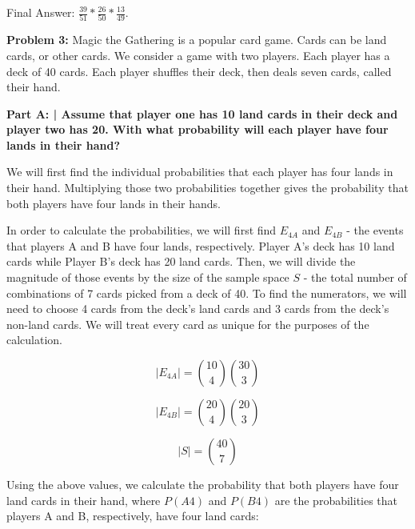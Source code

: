\documentclass{article}
\begin{document}
 Final Answer: $\frac{39}{51} * \frac{26}{50} * \frac{13}{49}$.\newline
 
 \newpage

 \begin{center}
      \Large\textbf{Problem 3:} Magic the Gathering is a popular card game. Cards can be land cards, or other cards. We consider a game with two players. Each player has a deck of 40 cards. Each player shuffles their deck, then deals seven cards, called their hand.\par
 \end{center}

 \textbf{Part A: | Assume that player one has 10 land cards in their deck and player two has 20. With what probability will each player have four lands in their hand?}\newline
 
 We will first find the individual probabilities that each player has four lands in their hand. Multiplying those two probabilities together gives the probability that both players have four lands in their hands.\newline
 
 In order to calculate the probabilities, we will first find $E_{4A}$ and $E_{4B}$ - the events that players A and B have four lands, respectively. Player A's deck has 10 land cards while Player B's deck has 20 land cards. Then, we will divide the magnitude of those events by the size of the sample space $S$ - the total number of combinations of 7 cards picked from a deck of 40. To find the numerators, we will need to choose 4 cards from the deck's land cards and 3 cards from the deck's non-land cards. We will treat every card as unique for the purposes of the calculation. \newline

 \begin{displaymath}
    |E_{4A}| = {10 \choose 4}{30 \choose 3}
 \end{displaymath}
 
 \begin{displaymath}
    |E_{4B}| = {20 \choose 4}{20 \choose 3}
 \end{displaymath}
 
 \begin{displaymath}
    |S| = {40 \choose 7}
 \end{displaymath}
 
 Using the above values, we calculate the probability that both players have four land cards in their hand, where $P(A4)$ and $P(B4)$ are the probabilities that players A and B, respectively, have four land cards: 
 
\end{document}
